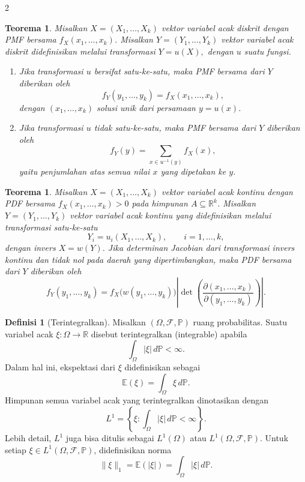 \documentclass[a4paper,extrafontsizes, 9pt]{memoir}
\theoremstyle{definition}
\newtheorem{definisi}[kalstok]{Definisi}
\theoremstyle{plain}
\newtheorem{teorema}[kalstok]{Teorema}
\theoremstyle{remark}
\begin{document}
\begin{multicols}{2}
  \begin{teorema}
    Misalkan $X=(X_1,\ldots,X_k)$ vektor variabel acak diskrit dengan PMF bersama
    $f_X(x_1,\ldots,x_k)$. Misalkan $Y=(Y_1,\ldots,Y_k)$ vektor variabel acak diskrit
    didefinisikan melalui transformasi
    $Y=u(X),$
    dengan $u$ suatu fungsi.
    \begin{enumerate}[leftmargin=*, itemsep=0.5mm]
      \item Jika transformasi $u$ bersifat satu-ke-satu, maka PMF bersama dari $Y$ diberikan oleh
            \[f_Y(y_1,\ldots,y_k)=f_X(x_1,\ldots,x_k),\]
            dengan $(x_1,\ldots,x_k)$ solusi unik dari persamaan $y=u(x)$.
      \item Jika transformasi $u$ tidak satu-ke-satu, maka PMF bersama dari $Y$ diberikan oleh
            \[f_Y(y)=\sum_{x\in u^{-1}(y)}f_X(x),\]
            yaitu penjumlahan atas semua nilai $x$ yang dipetakan ke $y$.
    \end{enumerate}
  \end{teorema}

  \begin{teorema}
    Misalkan $X=(X_1,\ldots,X_k)$ vektor variabel acak kontinu dengan PDF bersama
    $f_X(x_1,\ldots,x_k)>0$ pada himpunan $A\subseteq\mathbb{R}^k$.
    Misalkan $Y=(Y_1,\ldots,Y_k)$ vektor variabel acak kontinu yang didefinisikan melalui
    transformasi satu-ke-satu
    \[Y_i=u_i(X_1,\ldots,X_k),\qquad i=1,\ldots,k,\]
    dengan invers $X=w(Y)$. Jika determinan Jacobian dari transformasi invers kontinu dan tidak nol
    pada daerah yang dipertimbangkan, maka PDF bersama dari $Y$ diberikan oleh
    \[f_Y(y_1,\ldots,y_k)=f_X\bigl(w(y_1,\ldots,y_k)\bigr)
      \left|\det\!\left(\frac{\partial(x_1,\ldots,x_k)}{\partial(y_1,\ldots,y_k)}\right)\right|.\]
  \end{teorema}

  \begin{definisi}[Terintegralkan]
    Misalkan $(\Omega,\mathcal{F},\mathbb{P})$ ruang probabilitas.
    Suatu variabel acak $\xi:\Omega\to\mathbb{R}$ disebut terintegralkan (integrable) apabila
    \[\int_{\Omega}|\xi|\,d\mathbb{P}<\infty.\]
    Dalam hal ini, ekspektasi dari $\xi$ didefinisikan sebagai
    \[\mathbb{E}(\xi)=\int_{\Omega}\xi\,d\mathbb{P}.\]
    Himpunan semua variabel acak yang terintegralkan dinotasikan dengan
    \[L^1=\left\{\xi:\int_{\Omega}|\xi|\,d\mathbb{P}<\infty\right\}.\]
    Lebih detail, $L^1$ juga bisa ditulis sebagai $L^1(\Omega)$ atau $L^1(\Omega,\mathcal{F},\mathbb{P})$.
    Untuk setiap $\xi\in L^1(\Omega,\mathcal{F},\mathbb{P})$, didefinisikan norma
    \[\|\xi\|_1=\mathbb{E}(|\xi|)=\int_{\Omega}|\xi|\,d\mathbb{P}.\]
  \end{definisi}


\end{multicols}
\end{document}
